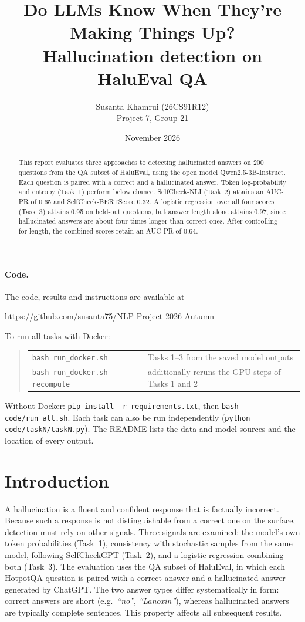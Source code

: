 \documentclass[11pt,a4paper]{article}
\title{\textbf{Do LLMs Know When They're Making Things Up?}\\[4pt]
\large Hallucination detection on HaluEval QA}
\author{Susanta Khamrui (26CS91R12)\\[2pt] \small Project 7, Group 21}
\date{November 2026}
\begin{document}
\maketitle

\begin{abstract}
\noindent
This report evaluates three approaches to detecting hallucinated answers on 200 questions from the
QA subset of HaluEval, using the open model Qwen2.5-3B-Instruct. Each question is paired with a
correct and a hallucinated answer. Token log-probability and entropy (Task~1) perform below
chance. SelfCheck-NLI (Task~2) attains an AUC-PR of 0.65 and SelfCheck-BERTScore 0.32. A logistic
regression over all four scores (Task~3) attains 0.95 on held-out questions, but answer length
alone attains 0.97, since hallucinated answers are about four times longer than correct ones.
After controlling for length, the combined scores retain an AUC-PR of 0.64.
\end{abstract}

\paragraph{Code.} The code, results and instructions are available at
\begin{center}
\url{https://github.com/susanta75/NLP-Project-2026-Autumn}
\end{center}
To run all tasks with Docker:
\begin{quote}\small
\begin{tabular}{@{}ll@{}}
\texttt{bash run\_docker.sh}             & Tasks 1--3 from the saved model outputs \\
\texttt{bash run\_docker.sh -{}-recompute} & additionally reruns the GPU steps of Tasks 1 and 2
\end{tabular}
\end{quote}
Without Docker: \texttt{pip install -r requirements.txt}, then \texttt{bash code/run\_all.sh}.
Each task can also be run independently (\texttt{python code/taskN/taskN.py}). The README lists
the data and model sources and the location of every output.

\section{Introduction}

A hallucination is a fluent and confident response that is factually incorrect. Because such a
response is not distinguishable from a correct one on the surface, detection must rely on other
signals. Three signals are examined: the model's own token probabilities (Task~1), consistency
with stochastic samples from the same model, following SelfCheckGPT (Task~2), and a logistic
regression combining both (Task~3). The evaluation uses the QA subset of HaluEval, in which each HotpotQA question is paired with a
correct answer and a hallucinated answer generated by ChatGPT. The two answer types differ
systematically in form: correct answers are short (e.g.\ \emph{``no''}, \emph{``Lanoxin''}),
whereas hallucinated answers are typically complete sentences. This property affects all
subsequent results.
\end{document}

